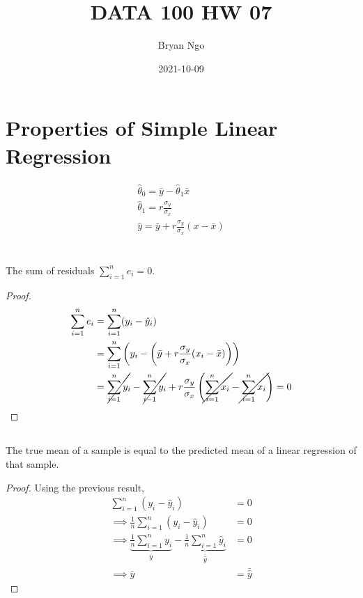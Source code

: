 \documentclass{article}
\title{DATA 100 HW 07}
\author{Bryan Ngo}
\date{2021-10-09}
\begin{document}
\maketitle

\section*{Properties of Simple Linear Regression}

\begin{gather}
    \hat{\theta}_0 = \bar{y} - \hat{\theta}_1 \bar{x} \\
    \hat{\theta}_1 = r \frac{\sigma_y}{\sigma_x} \\
    \hat{y} = \bar{y} + r \frac{\sigma_y}{\sigma_x} (x - \bar{x})
\end{gather}

\section{}

\subsection{}

\begin{theorem}
    The sum of residuals \(\sum_{i = 1}^n e_i = 0\).
\end{theorem}
\begin{proof}
    \begin{align}
        \sum_{i = 1}^n e_i &= \sum_{i = 1}^n (y_i - \hat{y}_i) \\
        &= \sum_{i = 1}^n \left(y_i - \left(\bar{y} + r \frac{\sigma_y}{\sigma_x} (x_i - \bar{x})\right)\right) \\
        &= \cancel{\sum_{i = 1}^n y_i} - \cancel{\sum_{i - 1}^n y_i} + r \frac{\sigma_y}{\sigma_x} \left(\cancel{\sum_{i = 1}^n x_i} - \cancel{\sum_{i = 1}^n x_i}\right) = 0
\end{align}
\end{proof}

\subsection{}

\begin{theorem}
    The true mean of a sample is equal to the predicted mean of a linear regression of that sample.
\end{theorem}
\begin{proof}
    Using the previous result,
    \begin{align}
        \sum_{i = 1}^n (y_i - \hat{y}_i) &= 0 \\
        \implies \frac{1}{n} \sum_{i = 1}^n (y_i - \hat{y}_i) &= 0 \\
        \implies \underbrace{\frac{1}{n} \sum_{i = 1}^n y_i}_{\bar{y}} - \underbrace{\frac{1}{n} \sum_{i = 1}^n \hat{y}_i}_{\bar{\hat{y}}} &= 0 \\
        \implies \bar{y} &= \bar{\hat{y}}
    \end{align}
\end{proof}
\end{document}

